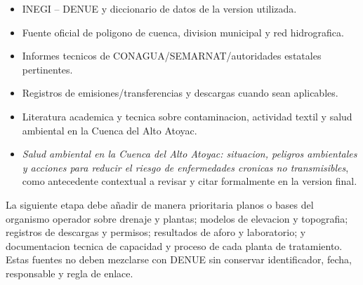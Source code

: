 \documentclass[11pt,letterpaper]{article}
\begin{document}
\begin{itemize}
    \item INEGI -- DENUE y diccionario de datos de la version utilizada.
    \item Fuente oficial de poligono de cuenca, division municipal y red hidrografica.
    \item Informes tecnicos de CONAGUA/SEMARNAT/autoridades estatales pertinentes.
    \item Registros de emisiones/transferencias y descargas cuando sean aplicables.
    \item Literatura academica y tecnica sobre contaminacion, actividad textil y salud ambiental en la Cuenca del Alto Atoyac.
    \item \textit{Salud ambiental en la Cuenca del Alto Atoyac: situacion, peligros ambientales y acciones para reducir el riesgo de enfermedades cronicas no transmisibles}, como antecedente contextual a revisar y citar formalmente en la version final.
\end{itemize}

La siguiente etapa debe añadir de manera prioritaria planos o bases del organismo operador sobre drenaje y plantas; modelos de elevacion y topografia; registros de descargas y permisos; resultados de aforo y laboratorio; y documentacion tecnica de capacidad y proceso de cada planta de tratamiento. Estas fuentes no deben mezclarse con DENUE sin conservar identificador, fecha, responsable y regla de enlace.



\end{document}
